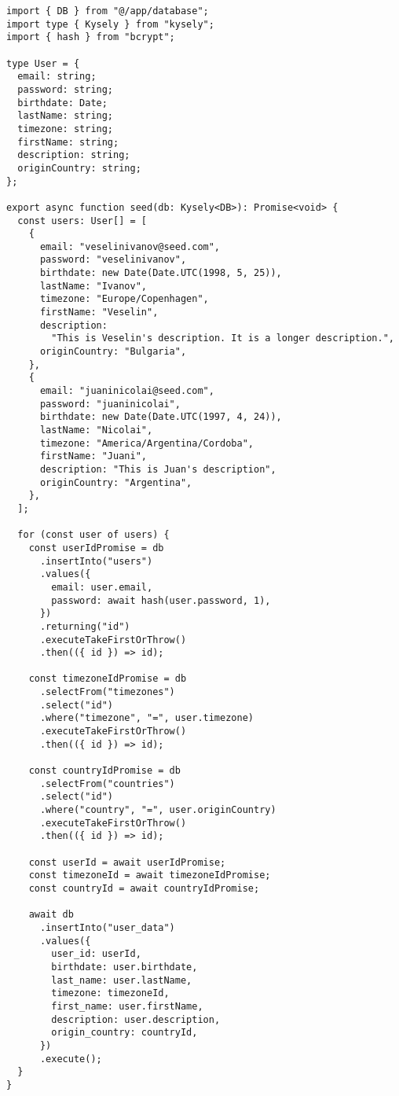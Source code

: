 \begin{verbatim}
import { DB } from "@/app/database";
import type { Kysely } from "kysely";
import { hash } from "bcrypt";

type User = {
  email: string;
  password: string;
  birthdate: Date;
  lastName: string;
  timezone: string;
  firstName: string;
  description: string;
  originCountry: string;
};

export async function seed(db: Kysely<DB>): Promise<void> {
  const users: User[] = [
    {
      email: "veselinivanov@seed.com",
      password: "veselinivanov",
      birthdate: new Date(Date.UTC(1998, 5, 25)),
      lastName: "Ivanov",
      timezone: "Europe/Copenhagen",
      firstName: "Veselin",
      description:
        "This is Veselin's description. It is a longer description.",
      originCountry: "Bulgaria",
    },
    {
      email: "juaninicolai@seed.com",
      password: "juaninicolai",
      birthdate: new Date(Date.UTC(1997, 4, 24)),
      lastName: "Nicolai",
      timezone: "America/Argentina/Cordoba",
      firstName: "Juani",
      description: "This is Juan's description",
      originCountry: "Argentina",
    },
  ];

  for (const user of users) {
    const userIdPromise = db
      .insertInto("users")
      .values({
        email: user.email,
        password: await hash(user.password, 1),
      })
      .returning("id")
      .executeTakeFirstOrThrow()
      .then(({ id }) => id);

    const timezoneIdPromise = db
      .selectFrom("timezones")
      .select("id")
      .where("timezone", "=", user.timezone)
      .executeTakeFirstOrThrow()
      .then(({ id }) => id);

    const countryIdPromise = db
      .selectFrom("countries")
      .select("id")
      .where("country", "=", user.originCountry)
      .executeTakeFirstOrThrow()
      .then(({ id }) => id);

    const userId = await userIdPromise;
    const timezoneId = await timezoneIdPromise;
    const countryId = await countryIdPromise;

    await db
      .insertInto("user_data")
      .values({
        user_id: userId,
        birthdate: user.birthdate,
        last_name: user.lastName,
        timezone: timezoneId,
        first_name: user.firstName,
        description: user.description,
        origin_country: countryId,
      })
      .execute();
  }
}
\end{verbatim}